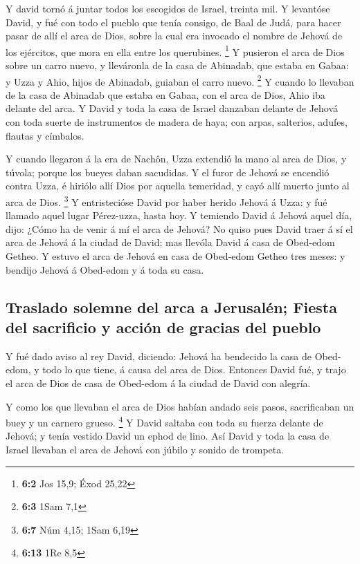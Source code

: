  Y david tornó á juntar todos los escogidos de Israel,
treinta mil.  Y levantóse David, y fué con todo el pueblo
que tenía consigo, de Baal de Judá, para hacer pasar de allí el arca de
Dios, sobre la cual era invocado el nombre de Jehová de los ejércitos,
que mora en ella entre los querubines. \footnote{\textbf{6:2} Jos 15,9;
  Éxod 25,22}  Y pusieron el arca de Dios sobre un carro
nuevo, y lleváronla de la casa de Abinadab, que estaba en Gabaa: y Uzza
y Ahio, hijos de Abinadab, guiaban el carro nuevo. \footnote{\textbf{6:3}
  1Sam 7,1}  Y cuando lo llevaban de la casa de Abinadab que
estaba en Gabaa, con el arca de Dios, Ahio iba delante del arca.
 Y David y toda la casa de Israel danzaban delante de Jehová
con toda suerte de instrumentos de madera de haya; con arpas, salterios,
adufes, flautas y címbalos.

 Y cuando llegaron á la era de Nachôn, Uzza extendió la mano
al arca de Dios, y túvola; porque los bueyes daban sacudidas.
 Y el furor de Jehová se encendió contra Uzza, é hiriólo
allí Dios por aquella temeridad, y cayó allí muerto junto al arca de
Dios. \footnote{\textbf{6:7} Núm 4,15; 1Sam 6,19}  Y
entristecióse David por haber herido Jehová á Uzza: y fué llamado aquel
lugar Pérez-uzza, hasta hoy.  Y temiendo David á Jehová
aquel día, dijo: ¿Cómo ha de venir á mí el arca de Jehová? 
No quiso pues David traer á sí el arca de Jehová á la ciudad de David;
mas llevóla David á casa de Obed-edom Getheo.  Y estuvo el
arca de Jehová en casa de Obed-edom Getheo tres meses: y bendijo Jehová
á Obed-edom y á toda su casa.

\hypertarget{traslado-solemne-del-arca-a-jerusaluxe9n-fiesta-del-sacrificio-y-acciuxf3n-de-gracias-del-pueblo}{%
\subsection{Traslado solemne del arca a Jerusalén; Fiesta del sacrificio
y acción de gracias del
pueblo}\label{traslado-solemne-del-arca-a-jerusaluxe9n-fiesta-del-sacrificio-y-acciuxf3n-de-gracias-del-pueblo}}

 Y fué dado aviso al rey David, diciendo: Jehová ha
bendecido la casa de Obed-edom, y todo lo que tiene, á causa del arca de
Dios. Entonces David fué, y trajo el arca de Dios de casa de Obed-edom á
la ciudad de David con alegría.

 Y como los que llevaban el arca de Dios habían andado seis
pasos, sacrificaban un buey y un carnero grueso. \footnote{\textbf{6:13}
  1Re 8,5}  Y David saltaba con toda su fuerza delante de
Jehová; y tenía vestido David un ephod de lino.  Así David
y toda la casa de Israel llevaban el arca de Jehová con júbilo y sonido
de trompeta.

